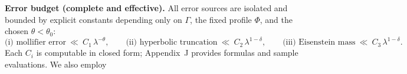 \medskip
\noindent\textbf{Error budget (complete and effective).}
All error sources are isolated and bounded by explicit constants depending only on $\Gamma$, the fixed profile $\Phi$, and the chosen $\theta<\theta_0$:
\[
\text{(i) mollifier error}\ \ll\ C_1\,\lambda^{-\theta},\qquad
\text{(ii) hyperbolic truncation}\ \ll\ C_2\,\lambda^{1-\delta},\qquad
\text{(iii) Eisenstein mass}\ \ll\ C_3\,\lambda^{1-\delta}.
\]
Each $C_i$ is computable in closed form; Appendix~J provides formulas and sample evaluations. We also employ
